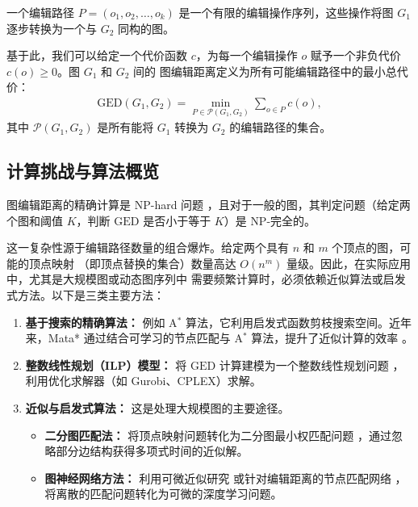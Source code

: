 一个编辑路径 $P=(o_1,o_2,\dots,o_k)$ 是一个有限的编辑操作序列，这些操作将图 $G_1$ 逐步转换为一个与 $G_2$ 同构的图。

基于此，我们可以给定一个代价函数 $c$，为每一个编辑操作 $o$ 赋予一个非负代价 $c(o) \geq 0$。图 $G_1$ 和 $G_2$ 间的
图编辑距离定义为所有可能编辑路径中的最小总代价：
\begin{align}
\mathrm{GED}(G_1,G_2)
= \min_{P\in\mathcal{P}(G_1,G_2)} \sum_{o\in P} c(o),
\end{align}
其中 $\mathcal{P}(G_1,G_2)$ 是所有能将 $G_1$ 转换为 $G_2$ 的编辑路径的集合。

\subsection{计算挑战与算法概览}
图编辑距离的精确计算是 \textsc{NP}-hard 问题 \cite{blumenthal2020exact}，且对于一般的图，其判定问题（给定两个图和阈值 $K$，判断 $\mathrm{GED}$ 是否小于等于 $K$）是 \textsc{NP}-完全的。

这一复杂性源于编辑路径数量的组合爆炸。给定两个具有 $n$ 和 $m$ 个顶点的图，可能的顶点映射
（即顶点替换的集合）数量高达 $O(n^m)$ 量级。因此，在实际应用中，尤其是大规模图或动态图序列中
需要频繁计算时，必须依赖近似算法或启发式方法。以下是三类主要方法：

\begin{enumerate}[label=\arabic*.]
  \item \textbf{基于搜索的精确算法：} 例如 A$^*$ 算法，它利用启发式函数剪枝搜索空间。近年来，Mata* 通过结合可学习的节点匹配与 A$^*$ 算法，提升了近似计算的效率 \cite{liu2023mata}。

  \item \textbf{整数线性规划（ILP）模型：} 将 $\mathrm{GED}$ 计算建模为一个整数线性规划问题 \cite{blumenthal2020exact}，利用优化求解器（如 Gurobi、CPLEX）求解。

  \item \textbf{近似与启发式算法：} 这是处理大规模图的主要途径。
        \begin{itemize}
          \item \textbf{二分图匹配法：} 将顶点映射问题转化为二分图最小权匹配问题 \cite{riesen2009approximate}，通过忽略部分边结构获得多项式时间的近似解。
          \item \textbf{图神经网络方法：} 利用可微近似研究 \cite{wallnig2024differentiable} 或针对编辑距离的节点匹配网络 \cite{moscatelli2024graph, li2019graph}，将离散的匹配问题转化为可微的深度学习问题。
        \end{itemize}
\end{enumerate}

